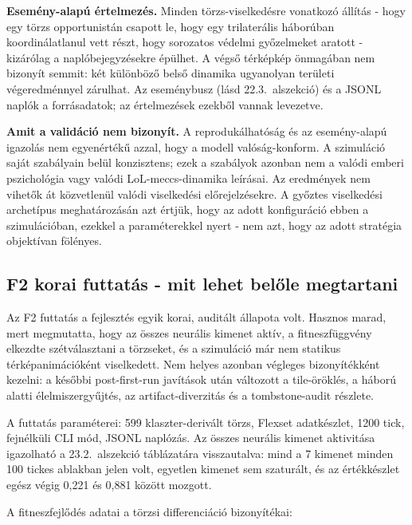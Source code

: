 ﻿\documentclass[a4paper,12pt]{report}
\begin{document}
\textbf{Esemény-alapú értelmezés.} Minden törzs-viselkedésre vonatkozó állítás - hogy egy törzs opportunistán csapott le, hogy egy trilaterális háborúban koordinálatlanul vett részt, hogy sorozatos védelmi győzelmeket aratott - kizárólag a naplóbejegyzésekre épülhet. A végső térképkép önmagában nem bizonyít semmit: két különböző belső dinamika ugyanolyan területi végeredménnyel zárulhat. Az eseménybusz (lásd 22.3.~alszekció) és a JSONL naplók a forrásadatok; az értelmezések ezekből vannak levezetve.

\textbf{Amit a validáció nem bizonyít.} A reprodukálhatóság és az esemény-alapú igazolás nem egyenértékű azzal, hogy a modell valóság-konform. A szimuláció saját szabályain belül konzisztens; ezek a szabályok azonban nem a valódi emberi pszichológia vagy valódi LoL-meccs-dinamika leírásai. Az eredmények nem vihetők át közvetlenül valódi viselkedési előrejelzésekre. A győztes viselkedési archetípus meghatározásán azt értjük, hogy az adott konfiguráció ebben a szimulációban, ezekkel a paraméterekkel nyert - nem azt, hogy az adott stratégia objektívan fölényes.

\subsection*{F2 korai futtatás - mit lehet belőle megtartani}

Az F2 futtatás a fejlesztés egyik korai, auditált állapota volt. Hasznos marad,
mert megmutatta, hogy az összes neurális kimenet aktív, a fitneszfüggvény elkezdte
szétválasztani a törzseket, és a szimuláció már nem statikus térképanimációként
viselkedett. Nem helyes azonban végleges bizonyítékként kezelni: a későbbi
post-first-run javítások után változott a tile-öröklés, a háború alatti
élelmiszergyűjtés, az artifact-diverzitás és a tombstone-audit részlete.

A futtatás paraméterei: 599 klaszter-derivált törzs, Flexset adatkészlet, 1200 tick, fejnélküli CLI mód, JSONL naplózás. Az összes neurális kimenet aktivitása igazolható a 23.2.~alszekció táblázatára visszautalva: mind a 7 kimenet minden 100 tickes ablakban jelen volt, egyetlen kimenet sem szaturált, és az értékkészlet egész végig 0,221 és 0,881 között mozgott.

A fitneszfejlődés adatai a törzsi differenciáció bizonyítékai:
\end{document}
